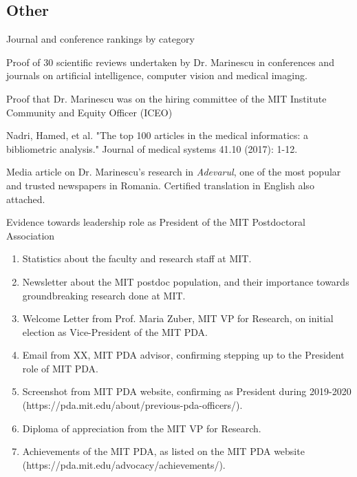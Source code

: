 \documentclass[11pt]{article}
\begin{document}
\begin{thebibliography}{9}
\subsection*{Other}

Journal and conference rankings by category

Proof of 30 scientific reviews undertaken by  Dr. Marinescu in conferences and journals on artificial intelligence, computer vision and medical imaging.

Proof that Dr. Marinescu  was on the hiring committee of the MIT Institute Community and Equity Officer (ICEO)  

Nadri, Hamed, et al. "The top 100 articles in the medical informatics: a bibliometric analysis." Journal of medical systems 41.10 (2017): 1-12.

Media article on Dr. Marinescu's research in \emph{Adevarul}, one of the most popular and trusted newspapers in Romania. Certified translation in English also attached.

Evidence towards \drs leadership role as President of the MIT Postdoctoral Association
\begin{enumerate}
\item Statistics about the faculty and research staff at MIT.
\item Newsletter about the MIT postdoc population, and their importance towards groundbreaking research done at MIT.
\item Welcome Letter from Prof. Maria Zuber, MIT VP for Research, on \drs initial election as Vice-President of the MIT PDA.
\item Email from XX, MIT PDA advisor, confirming \dr stepping up to the President role of MIT PDA.
\item Screenshot from MIT PDA website, confirming \dr as President during 2019-2020 (https://pda.mit.edu/about/previous-pda-officers/).
\item Diploma of appreciation from the MIT VP for Research.
\item Achievements of the MIT PDA, as listed on the MIT PDA website (https://pda.mit.edu/advocacy/achievements/).
\end{enumerate}


\end{thebibliography}
\end{document}
